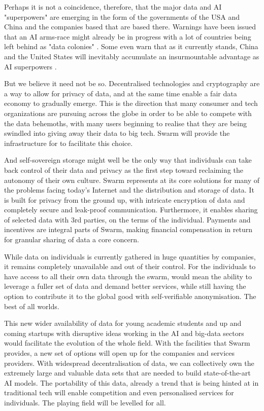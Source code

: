 Perhaps it is not a coincidence, therefore, that the major data and AI "superpowers" are emerging in the form of the governments of the USA and China and the companies based that are based there. Warnings have been issued that an AI arms-race might already be in progress with a lot of countries being left behind as "data colonies" \cite{HarariDavos2020Mar}. Some even warn that as it currently stands, China and the United States will inevitably accumulate an insurmountable advantage as AI superpowers \cite{Lee2018Sep}.

But we believe it need not be so. Decentralised technologies and cryptography are a way to allow for privacy of data, and at the same time enable a fair data economy to gradually emerge. This is the direction that many consumer and tech organizations are pursuing across the globe in order to be able to compete with the data behemoths, with many users beginning to realise that they are being swindled into giving away their data to big tech. Swarm will provide the infrastructure for to facilitate this choice.

And self-sovereign storage might well be the only way that individuals can take back control of their data and privacy as the first step toward reclaiming the autonomy of their own culture. Swarm represents at its core solutions for many of the problems facing today's Internet and the distribution and storage of data. It is built for privacy from the ground up, with intricate encryption of data and completely secure and leak-proof communication. Furthermore, it enables sharing of selected data with 3rd parties, on the terms of the individual. Payments and incentives are integral parts of Swarm, making financial compensation in return for granular sharing of data a core concern.

While data on individuals is currently gathered in huge quantities by companies, it remains completely unavailable and out of their control. For the individuals to have access to all their own data through the swarm, would mean the ability to leverage a fuller set of data and demand better services, while still having the option to contribute it to the global good with self-verifiable anonymisation. The best of all worlds.

This new wider availability of data for young academic students and up and coming startups with disruptive ideas working in the AI and big-data sectors would facilitate the evolution of the whole field. With the facilities that Swarm provides, a new set of options will open up for the companies and services providers. With widespread decentralisation of data, we can collectively own the extremely large and valuable data sets that are needed to build state-of-the-art AI models. The portability of this data, already a trend that is being hinted at in traditional tech will enable competition and even personalised services for individuals. The playing field will be levelled for all. 




